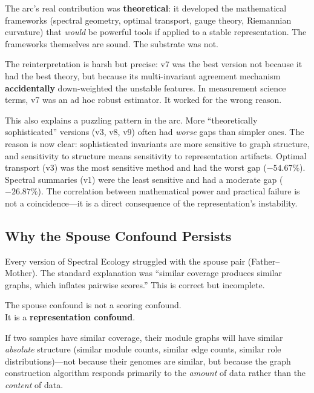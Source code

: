 \documentclass{../yalumba}
\begin{document}
The arc's real contribution was \textbf{theoretical}: it developed the
mathematical frameworks (spectral geometry, optimal transport, gauge
theory, Riemannian curvature) that \emph{would} be powerful tools if
applied to a stable representation.  The frameworks themselves are
sound.  The substrate was not.

\begin{limitation}
The reinterpretation is harsh but precise: v7 was the best version not
because it had the best theory, but because its multi-invariant
agreement mechanism \textbf{accidentally} down-weighted the unstable
features.  In measurement science terms, v7 was an ad hoc robust
estimator.  It worked for the wrong reason.
\end{limitation}

This also explains a puzzling pattern in the arc.  More ``theoretically
sophisticated'' versions (v3, v8, v9) often had \emph{worse} gaps than
simpler ones.  The reason is now clear: sophisticated invariants are
more sensitive to graph structure, and sensitivity to structure means
sensitivity to representation artifacts.  Optimal transport (v3) was
the most sensitive method and had the worst gap ($-54.67\%$).  Spectral
summaries (v1) were the least sensitive and had a moderate gap
($-26.87\%$).  The correlation between mathematical power and practical
failure is not a coincidence---it is a direct consequence of the
representation's instability.

\subsection{Why the Spouse Confound Persists}
\label{sec:spouse-confound}

Every version of Spectral Ecology struggled with the spouse pair
(Father--Mother).  The standard explanation was ``similar coverage
produces similar graphs, which inflates pairwise scores.''  This is
correct but incomplete.

\begin{pullquote}
The spouse confound is not a scoring confound.\\It is a
\textbf{representation confound}.
\end{pullquote}

If two samples have similar coverage, their module graphs will have
similar \emph{absolute} structure (similar module counts, similar edge
counts, similar role distributions)---not because their genomes are
similar, but because the graph construction algorithm responds primarily
to the \emph{amount} of data rather than the \emph{content} of data.
\end{document}
